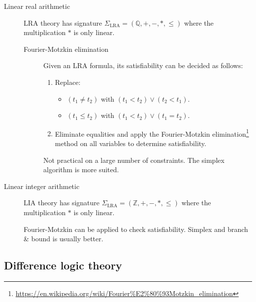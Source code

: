 \begin{description}
    \item[Linear real arithmetic] 
        LRA theory has signature $\Sigma_\text{LRA} = (\mathbb{Q}, +, -, *, \leq)$
        where the multiplication $*$ is only linear.
        
        \begin{description}
            \item[Fourier-Motzkin elimination] 
                Given an LRA formula, its satisfiability can be decided as follows:
                \begin{enumerate}
                    \item Replace:
                    \begin{itemize}
                        \item $(t_1 \neq t_2)$ with $(t_1 < t_2) \vee (t_2 < t_1)$.
                        \item $(t_1 \leq t_2)$ with $(t_1 < t_2) \vee (t_1 = t_2)$.
                    \end{itemize}
                    \item Eliminate equalities and apply the Fourier-Motzkin elimination\footnote{\url{https://en.wikipedia.org/wiki/Fourier\%E2\%80\%93Motzkin_elimination}} 
                    method on all variables to determine satisfiability.
                \end{enumerate}
        
                \begin{remark}
                    Not practical on a large number of constraints.
                    The simplex algorithm is more suited.
                \end{remark}
        \end{description}

    \item[Linear integer arithmetic]
        LIA theory has signature $\Sigma_\text{LRA} = (\mathbb{Z}, +, -, *, \leq)$
        where the multiplication $*$ is only linear.

        Fourier-Motzkin can be applied to check satisfiability.
        Simplex and branch \& bound is usually better.
\end{description}


\subsection{Difference logic theory}

